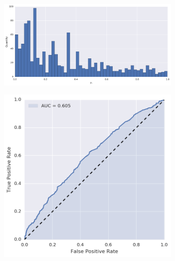 \begin{figure}[p]
\centering
\begin{subfigure}[t]{\textwidth}
	\centering
	\includegraphics[height=.20\textheight]{figures/bayes/least1/hist_sms.png}
\end{subfigure}
\begin{subfigure}[b]{.49\textwidth}
	\raggedleft{}
	\includegraphics[height=.20\textheight]{figures/bayes/least1/roc_sms.png}
\end{subfigure}
\begin{subfigure}[b]{.49\textwidth}
	\raggedright{}

\end{subfigure}
\end{figure}
